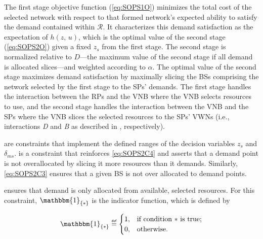 \documentclass[12pt,dvipsnames]{report}
\newif\ifisdoublespacing
\newcommand\defeq{\mathrel{\overset{\makebox[0pt]{\mbox{\normalfont\tiny\sffamily def}}}{=}}}
\newcommand{\ind}[1]{\mathbbm{1}_{\left\{ #1 \right\}}}
\begin{document}
The first stage objective function (\cref{eq:SOPS1O}) minimizes the total cost of the selected network with respect to that formed network's expected ability to satisfy the demand contained within $\mathcal{R}$.  It characterizes this demand satisfaction as the expectation of $h\left( z,\, u \right)$, which is the optimal value of the second stage (\cref{eq:SOPS2O}) given a fixed $z_s$ from the first stage.  The second stage is normalized relative to $D$---the maximum value of the second stage if all demand is allocated slices---and weighted according to $\alpha$.  The optimal value of the second stage maximizes demand satisfaction by maximally slicing the BSs comprising the network selected by the first stage to the SPs' demands.  The first stage handles the interaction between the RPs and the VNB where the VNB selects resources to use, and the second stage handles the interaction between the VNB and the SPs where the VNB slices the selected resources to the SPs' VWNs (i.e., interactions \emph{D} and \emph{B} as described in , respectively).

 are constraints that implement the defined ranges of the decision variables $z_s$ and $\delta_{ms}$.   is a constraint that reinforces \cref{eq:SOPS2C4} and asserts that a demand point is not overallocated by slicing it more resources than it demands.  Similarly, \cref{eq:SOPS2C3} ensures that a given BS is not over allocated to demand points.

 ensures that demand is only allocated from available, selected resources.  For this constraint, $\ind{*}$ is the indicator function, which is defined by

\ifisdoublespacing
\begin{singlespacing}
\begin{equation} \label{eq:indicator}
\ind{*} \defeq
	\begin{cases}
		1,& \text{if condition $*$ is true;}\\
		\\
		0,& \text{otherwise}.
	\end{cases}
\end{equation}
\end{singlespacing}
\else
\begin{equation} \label{eq:indicator}
\ind{*} \defeq
	\begin{cases}
		1,& \text{if condition $*$ is true;}\\
		0,& \text{otherwise}.
	\end{cases}
\end{equation}
\fi
\end{document}
